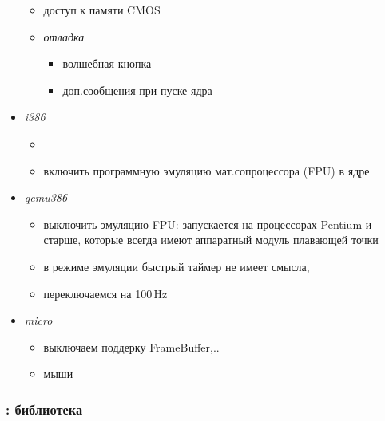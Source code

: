\begin{itemize}
\begin{itemize}
\item {} доступ к памяти CMOS

\item \emph{отладка}
  \begin{itemize}
\item {} волшебная кнопка 
\item {} доп.сообщения при пуске ядра
  \end{itemize}

  \end{itemize}

  \item {} \emph{i386} 

\begin{itemize}
  \item {}
  \item {} включить программную эмуляцию мат.сопроцессора
  (FPU) в ядре
\end{itemize}
   
  \item {} \emph{qemu386} 
  
\begin{itemize}
\item {} выключить эмуляцию FPU:  запускается
на процессорах Pentium и старше, которые всегда имеют аппаратный модуль
плавающей точки
\item {}  в режиме эмуляции быстрый таймер не
имеет смысла,

\item {} переключаемся на 100\,Hz
\end{itemize}


  \item {} \emph{micro}

\begin{itemize}
\item {} выключаем поддерку FrameBuffer,.. 
\item {} мыши
\end{itemize}
  
\end{itemize}

\subsubsection{: библиотека } \label{azulibc}

